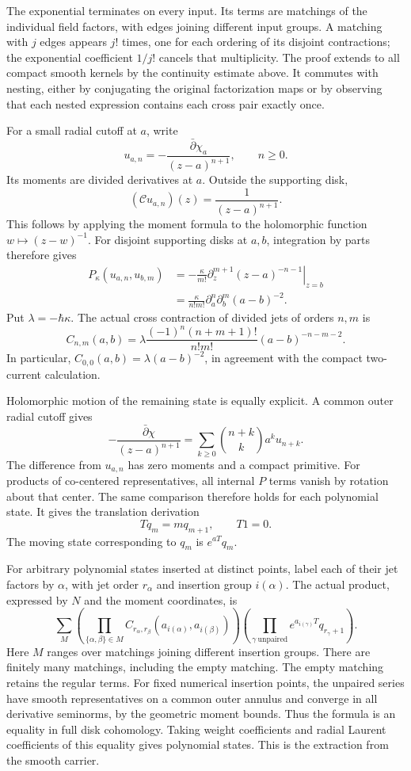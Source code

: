 The exponential terminates on every input.  Its terms are matchings
of the individual field factors, with edges joining different input
groups.  A matching with $j$ edges appears $j!$ times, one for each
ordering of its disjoint contractions; the exponential coefficient
$1/j!$ cancels that multiplicity.  The proof extends to all compact
smooth kernels by the continuity estimate above.  It commutes with
nesting, either by conjugating the original factorization maps or
by observing that each nested expression contains each cross pair
exactly once.

For a small radial cutoff at $a$, write
\[
 u_{a,n}=-\frac{\bar\partial\chi_a}{(z-a)^{n+1}},\qquad n\ge0.
\]
Its moments are divided derivatives at $a$.  Outside the supporting disk,
\[
 (\mathscr C u_{a,n})(z)=\frac1{(z-a)^{n+1}}.
\]
This follows by applying the moment formula to the holomorphic
function $w\mapsto(z-w)^{-1}$.  For disjoint supporting disks at
$a,b$, integration by parts therefore gives
\[
 \begin{split}
 P_\kappa(u_{a,n},u_{b,m})
 &=-\frac\kappa{m!}\left.
       \partial_z^{m+1}(z-a)^{-n-1}\right|_{z=b}\\
 &=\frac\kappa{n!m!}
       \partial_a^n\partial_b^m(a-b)^{-2}.
 \end{split}
\]
Put $\lambda=-\hbar\kappa$.  The actual cross contraction of divided
jets of orders $n,m$ is
\[
 C_{n,m}(a,b)=
 \lambda\frac{(-1)^n(n+m+1)!}{n!m!}(a-b)^{-n-m-2}.
\]
In particular, $C_{0,0}(a,b)=\lambda(a-b)^{-2}$, in agreement with
the compact two-current calculation.

Holomorphic motion of the remaining state is equally explicit.  A
common outer radial cutoff gives
\[
 -\frac{\bar\partial\chi}{(z-a)^{n+1}}
  =\sum_{k\ge0}\binom{n+k}{k}a^ku_{n+k}.
\]
The difference from $u_{a,n}$ has zero moments and a compact primitive.
For products of co-centered representatives, all internal $P$ terms
vanish by rotation about that center.  The same comparison therefore
holds for each polynomial state.  It gives the translation derivation
\[
 Tq_m=mq_{m+1},\qquad T1=0.
\]
The moving state corresponding to $q_m$ is $e^{aT}q_m$.

For arbitrary polynomial states inserted at distinct points, label
each of their jet factors by $\alpha$, with jet order $r_\alpha$ and
insertion group $i(\alpha)$.  The actual product, expressed by $N$
and the moment coordinates, is
\[
 \sum_M
  \left(\prod_{\{\alpha,\beta\}\in M}
       C_{r_\alpha,r_\beta}(a_{i(\alpha)},a_{i(\beta)})\right)
  \left(\prod_{\gamma\ \mathrm{unpaired}}
                e^{a_{i(\gamma)}T}q_{r_\gamma+1}\right).
\]
Here $M$ ranges over matchings joining different insertion groups.
There are finitely many matchings, including the empty matching.
The empty matching retains the regular terms.
For fixed numerical insertion points, the unpaired series have
smooth representatives on a common outer annulus and converge in
all derivative seminorms, by the geometric moment bounds.  Thus the
formula is an equality in full disk cohomology.  Taking weight
coefficients and radial Laurent coefficients of this equality gives
polynomial states.  This is the extraction from the smooth carrier.

